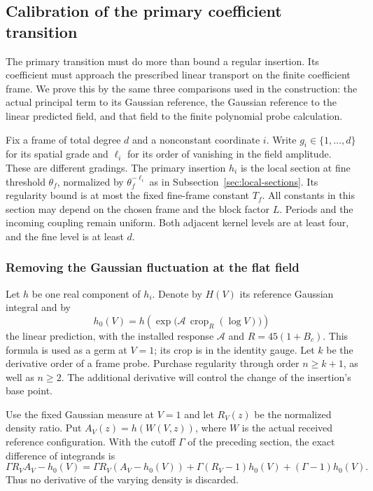 \subsection{Calibration of the primary coefficient transition}
\label{sec:primary-calibration-producer}
The primary transition must do more than bound a regular insertion. Its
coefficient must approach the prescribed linear transport on the finite
coefficient frame. We prove this by the same three comparisons used in
the construction: the actual principal term to its Gaussian reference,
the Gaussian reference to the linear predicted field, and that field to
the finite polynomial probe calculation.

Fix a frame of total degree $d$ and a nonconstant coordinate $i$. Write
$g_i\in\{1,\ldots,d\}$ for its spatial grade and $\ell_i$ for its
order of vanishing in the field amplitude. These are different gradings.
The primary insertion $h_i$ is the local section at fine threshold
$\theta_f$, normalized by $\theta_f^{-\ell_i}$ as in
Subsection~\ref{sec:local-sections}. Its regularity bound is at most the
fixed fine-frame constant $T_f$. All constants in this section may depend
on the chosen frame and the block factor $L$. Periods and the incoming
coupling remain uniform. Both adjacent kernel levels are at least four,
and the fine level is at least $d$.

\subsubsection{Removing the Gaussian fluctuation at the flat field}
Let $h$ be one real component of $h_i$. Denote by $H(V)$ its reference
Gaussian integral and by
\[
 h_0(V)=h\left(\exp\bigl(\mathcal A\,
                  \operatorname{crop}_{R}(\log V)\bigr)\right)
\]
the linear prediction, with the installed response $\mathcal A$ and
$R=45(1+B_c)$. This formula is used as a germ at $V=1$; its crop is in
the identity gauge. Let $k$ be the derivative order of a frame probe.
Purchase regularity through order $n\ge k+1$, as well as $n\ge2$.
The additional derivative will control the change of the insertion's
base point.

Use the fixed Gaussian measure at $V=1$ and let $R_V(z)$ be the
normalized density ratio. Put $A_V(z)=h(W(V,z))$, where $W$ is the
actual received reference configuration. With the cutoff $\Gamma$
of the preceding section, the exact difference of integrands is
\begin{equation}\label{eq:primary-integrand-difference}
 \Gamma R_V A_V-h_0(V)
 =\Gamma R_V(A_V-h_0(V))
       +\Gamma(R_V-1)h_0(V)+(\Gamma-1)h_0(V).
\end{equation}
Thus no derivative of the varying density is discarded.

